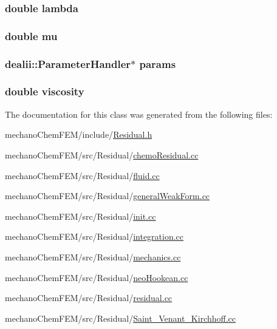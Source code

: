 \subsubsection[{lambda}]{\setlength{\rightskip}{0pt plus 5cm}double lambda}\label{class_residual_a3db359547eed8cfd48ca821d95f577af}
\subsubsection[{mu}]{\setlength{\rightskip}{0pt plus 5cm}double mu}\label{class_residual_a74577585cf12d1712ab9c57616d49205}
\subsubsection[{params}]{\setlength{\rightskip}{0pt plus 5cm}dealii\-::\-Parameter\-Handler$\ast$ params}\label{class_residual_accca5aede13ea52f0c11dff4daf1ad97}
\subsubsection[{viscosity}]{\setlength{\rightskip}{0pt plus 5cm}double viscosity}\label{class_residual_ad80875e5d1c4362e2eae93663ad723fb}


The documentation for this class was generated from the following files\-:\begin{DoxyCompactItemize}
\item 
mechano\-Chem\-F\-E\-M/include/\hyperlink{_residual_8h}{Residual.\-h}\item 
mechano\-Chem\-F\-E\-M/src/\-Residual/\hyperlink{chemo_residual_8cc}{chemo\-Residual.\-cc}\item 
mechano\-Chem\-F\-E\-M/src/\-Residual/\hyperlink{fluid_8cc}{fluid.\-cc}\item 
mechano\-Chem\-F\-E\-M/src/\-Residual/\hyperlink{general_weak_form_8cc}{general\-Weak\-Form.\-cc}\item 
mechano\-Chem\-F\-E\-M/src/\-Residual/\hyperlink{init_8cc}{init.\-cc}\item 
mechano\-Chem\-F\-E\-M/src/\-Residual/\hyperlink{integration_8cc}{integration.\-cc}\item 
mechano\-Chem\-F\-E\-M/src/\-Residual/\hyperlink{mechanics_8cc}{mechanics.\-cc}\item 
mechano\-Chem\-F\-E\-M/src/\-Residual/\hyperlink{neo_hookean_8cc}{neo\-Hookean.\-cc}\item 
mechano\-Chem\-F\-E\-M/src/\-Residual/\hyperlink{residual_8cc}{residual.\-cc}\item 
mechano\-Chem\-F\-E\-M/src/\-Residual/\hyperlink{_saint___venant___kirchhoff_8cc}{Saint\-\_\-\-Venant\-\_\-\-Kirchhoff.\-cc}\end{DoxyCompactItemize}
